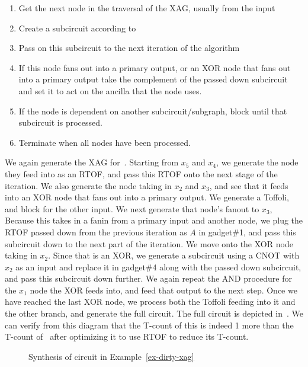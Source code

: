 \begin{enumerate}
\item Get the next node in the traversal of the XAG, usually from the input
\item Create a subcircuit according to~
\item Pass on this subcircuit to the next iteration of the algorithm
\item If this node fans out into a primary output, or an XOR node that fans out
  into a primary output take the complement of the passed down subcircuit and set
  it to act on the ancilla that the node uses.
\item If the node is dependent on another subcircuit/subgraph, block until that subcircuit is
  processed.
\item Terminate when all nodes have been processed.
\end{enumerate}

\begin{example}
  \label{ex-dirty-xag}
  We again generate the XAG for~. Starting from $x_5$ and $x_4$, we
  generate the node they feed into as an RTOF, and pass this RTOF onto the next stage of the iteration.
  We also generate the node taking in $x_2$ and $x_3$, and see that it feeds into an XOR node that
  fans out into a primary output. We generate a Toffoli, and block for the other input.
  We next generate that node's fanout to $x_3$, Because this takes in a fanin from a primary
  input and another node, we plug the RTOF passed down from the previous iteration as $A$
  in gadget\#1, and pass this subcircuit down to the next part of the iteration. We move onto
  the XOR node taking in $x_2$. Since that is an XOR, we generate a subcircuit using a CNOT with
  $x_2$ as an input and replace it in gadget\#4 along with the passed down subcircuit, and pass this
  subcircuit down further. We again repeat the AND procedure for the $x_1$ node the XOR feeds into,
  and feed that output to the next step. Once we have reached the last XOR node, we process both
  the Toffoli feeding into it and the other branch, and generate the full circuit. The full circuit
  is depicted in~. We can verify from this diagram that the T-count of this
  is indeed 1 more than the T-count of~ after optimizing it to use RTOF to reduce
  its T-count.
\end{example}

\begin{figure}[t]
  \centering
  \scalebox{0.8} {
    
  }
  \caption{Synthesis of circuit in Example~\ref{ex-dirty-xag}}
  \label{fig-prop-decomp}
\end{figure}


